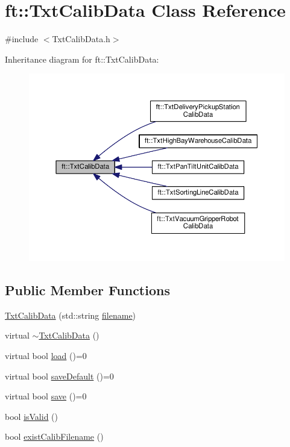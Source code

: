 \hypertarget{classft_1_1_txt_calib_data}{}\section{ft\+:\+:Txt\+Calib\+Data Class Reference}
\label{classft_1_1_txt_calib_data}


{\ttfamily \#include $<$Txt\+Calib\+Data.\+h$>$}



Inheritance diagram for ft\+:\+:Txt\+Calib\+Data\+:
\nopagebreak
\begin{figure}[H]
\begin{center}
\leavevmode
\includegraphics[width=350pt]{classft_1_1_txt_calib_data__inherit__graph}
\end{center}
\end{figure}
\subsection*{Public Member Functions}
\begin{DoxyCompactItemize}
\item 
\hyperlink{classft_1_1_txt_calib_data_a04d6b5689b2ef4973e5f4143e87bd24c}{Txt\+Calib\+Data} (std\+::string \hyperlink{classft_1_1_txt_calib_data_a4416924019587d7cb019b01652a20aab}{filename})
\item 
virtual \hyperlink{classft_1_1_txt_calib_data_ad3a67016c65d7c97ea7054d6997e3def}{$\sim$\+Txt\+Calib\+Data} ()
\item 
virtual bool \hyperlink{classft_1_1_txt_calib_data_abe888396c95ead8fd554fc77ba486e7a}{load} ()=0
\item 
virtual bool \hyperlink{classft_1_1_txt_calib_data_aace95b90ba43836acbd8f0cf1dd323c7}{save\+Default} ()=0
\item 
virtual bool \hyperlink{classft_1_1_txt_calib_data_a68a7bd5bfc32ebf82dd1a4fbe086a1b3}{save} ()=0
\item 
bool \hyperlink{classft_1_1_txt_calib_data_a85e3ba9c83b1143789c4116d946b476b}{is\+Valid} ()
\item 
bool \hyperlink{classft_1_1_txt_calib_data_aed66d1f47aaede36afe07185bef1eb9e}{exist\+Calib\+Filename} ()
\end{DoxyCompactItemize}

